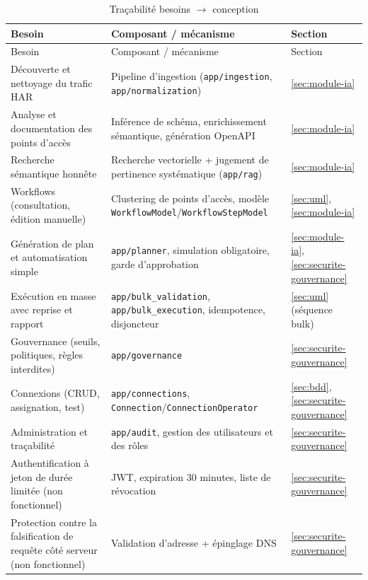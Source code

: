 \begin{longtable}{L{4cm}L{4.5cm}Y}
  \caption{Traçabilité besoins $\rightarrow$ conception} \label{tab:tracabilite} \\
  Besoin & Composant / mécanisme & Section \\
  \hline
  \endfirsthead
  Besoin & Composant / mécanisme & Section \\
  \hline
  \endhead
  Découverte et nettoyage du trafic HAR & Pipeline d'ingestion (\texttt{app/ingestion}, \texttt{app/normalization}) & \ref{sec:module-ia} \\ \hline
  Analyse et documentation des points d'accès & Inférence de schéma, enrichissement sémantique, génération OpenAPI & \ref{sec:module-ia} \\ \hline
  Recherche sémantique honnête & Recherche vectorielle + jugement de pertinence systématique (\texttt{app/rag}) & \ref{sec:module-ia} \\ \hline
  Workflows (consultation, édition manuelle) & Clustering de points d'accès, modèle \texttt{WorkflowModel}/\texttt{WorkflowStepModel} & \ref{sec:uml}, \ref{sec:module-ia} \\ \hline
  Génération de plan et automatisation simple & \texttt{app/planner}, simulation obligatoire, garde d'approbation & \ref{sec:module-ia}, \ref{sec:securite-gouvernance} \\ \hline
  Exécution en masse avec reprise et rapport & \texttt{app/bulk\_validation}, \texttt{app/bulk\_execution}, idempotence, disjoncteur & \ref{sec:uml} (séquence bulk) \\ \hline
  Gouvernance (seuils, politiques, règles interdites) & \texttt{app/governance} & \ref{sec:securite-gouvernance} \\ \hline
  Connexions (CRUD, assignation, test) & \texttt{app/connections}, \texttt{Connection}/\texttt{ConnectionOperator} & \ref{sec:bdd}, \ref{sec:securite-gouvernance} \\ \hline
  Administration et traçabilité & \texttt{app/audit}, gestion des utilisateurs et des rôles & \ref{sec:securite-gouvernance} \\ \hline
  Authentification à jeton de durée limitée (non fonctionnel) & JWT, expiration 30 minutes, liste de révocation & \ref{sec:securite-gouvernance} \\ \hline
  Protection contre la falsification de requête côté serveur (non fonctionnel) & Validation d'adresse + épinglage DNS & \ref{sec:securite-gouvernance} \\ \hline

\end{longtable}
